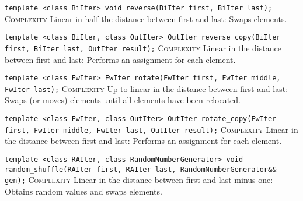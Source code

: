 \noindent{}\hspace*{0.25em}\lstinline[basicstyle=\ttfamily\color{corange}]{template <class BiIter> void reverse(BiIter first, BiIter last);} \textsc{Complexity} Linear in half the distance between first and last: Swaps elements.\\\vspace{-0.6em}

\noindent{}\hspace*{0.25em}\lstinline[basicstyle=\ttfamily\color{corange}]{template <class BiIter, class OutIter> OutIter reverse_copy(BiIter first, BiIter last, OutIter result);} \textsc{Complexity} Linear in the distance between first and last: Performs an assignment for each element.\\\vspace{-0.6em}

\noindent{}\hspace*{0.25em}\lstinline[basicstyle=\ttfamily\color{corange}]{template <class FwIter> FwIter rotate(FwIter first, FwIter middle, FwIter last);} \textsc{Complexity} Up to linear in the distance between first and last: Swaps (or moves) elements until all elements have been relocated.\\\vspace{-0.6em}

\noindent{}\hspace*{0.25em}\lstinline[basicstyle=\ttfamily\color{corange}]{template <class FwIter, class OutIter> OutIter rotate_copy(FwIter first, FwIter middle, FwIter last, OutIter result);} \textsc{Complexity} Linear in the distance between first and last: Performs an assignment for each element.\\\vspace{-0.6em}

\noindent{}\hspace*{0.25em}\lstinline[basicstyle=\ttfamily\color{corange}]{template <class RAIter, class RandomNumberGenerator> void random_shuffle(RAIter first, RAIter last, RandomNumberGenerator&& gen);} \textsc{Complexity} Linear in the distance between first and last minus one: Obtains random values and swaps elements.\\\vspace{-0.6em}

